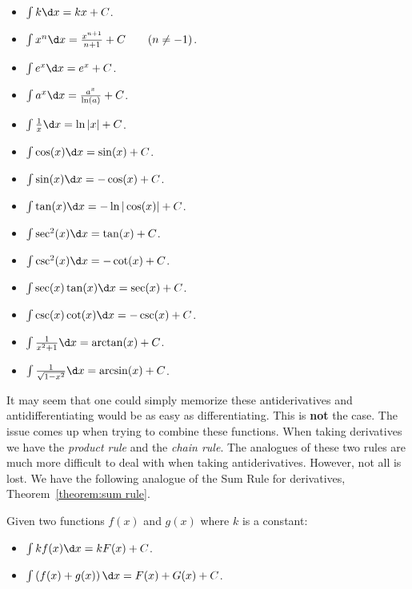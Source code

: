 \begin{fullwidth}
\begin{mainTheorem}\label{theorem:basicAnti} \hfil
\begin{multicols}{3}
\begin{itemize}
\item $\int k \d x= kx+C$.
\item $\int x^n \d x= \frac{x^{n+1}}{n+1}+C\qquad(n\ne-1)$.
\item $\int e^x \d x= e^x + C$.
\item $\int a^x \d x= \frac{a^x}{\ln(a)}+C$.
\item $\int \frac{1}{x} \d x= \ln|x|+C$.
\item $\int \cos(x) \d x = \sin(x) + C$.
\item $\int \sin(x) \d x = -\cos(x) + C$.  
\item $\int \tan(x) \d x = -\ln|\cos(x)| + C$.  
\item $\int \sec^2(x) \d x = \tan(x) + C$. 
\item $\int \csc^2(x) \d x = -\cot(x) + C$.
\item $\int \sec(x)\tan(x) \d x = \sec(x) + C$.
\item $\int \csc(x)\cot(x) \d x = -\csc(x) + C$.
\item $\int \frac{1}{x^2+1}\d x = \arctan(x) + C$.
\item $\int \frac{1}{\sqrt{1-x^2}}\d x= \arcsin(x)+C$.
\end{itemize}
\end{multicols}
\end{mainTheorem}
\end{fullwidth}
It may seem that one could simply memorize these antiderivatives and
antidifferentiating would be as easy as differentiating. This is
\textbf{not} the case. The issue comes up when trying to combine these
functions.  When taking derivatives we have the \textit{product rule}
and the \textit{chain rule}. The analogues of these two rules are much
more difficult to deal with when taking antiderivatives. However, not
all is lost. We have the following analogue of the Sum Rule for
derivatives, Theorem~\ref{theorem:sum rule}.

\begin{mainTheorem}\label{theorem:SRA}
Given two functions $f(x)$ and $g(x)$ where $k$ is a constant:
\begin{itemize}
\item $\int k f(x) \d x= kF(x) + C$.
\item $\int \left(f(x) + g(x)\right) \d x = F(x) + G(x) + C$.
\end{itemize}
\end{mainTheorem}

